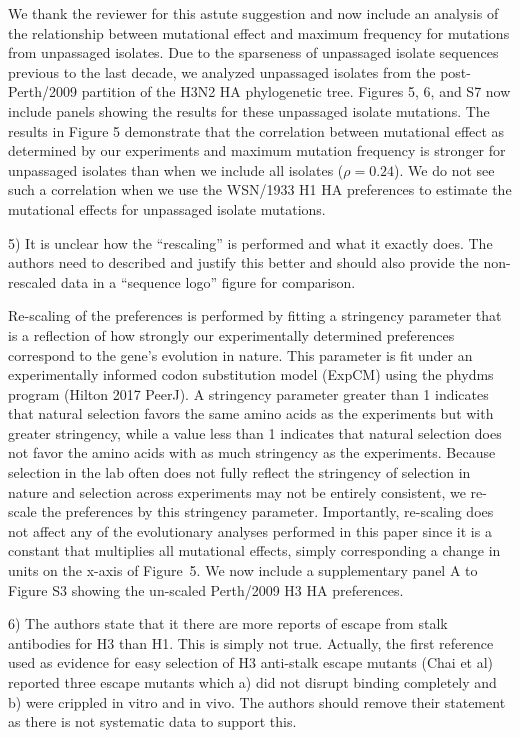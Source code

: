 \documentclass[11pt, oneside]{article}   	%
\newcommand{\response}[1]{{\color{black}#1}}
\begin{document}
\response{We thank the reviewer for this astute suggestion and now include an analysis of the relationship between mutational effect and maximum frequency for mutations from unpassaged isolates.
Due to the sparseness of unpassaged isolate sequences previous to the last decade, we analyzed unpassaged isolates from the post-Perth/2009 partition of the H3N2 HA phylogenetic tree.
Figures 5, 6, and S7 now include panels showing the results for these unpassaged isolate mutations.
The results in Figure 5 demonstrate that the correlation between mutational effect as determined by our experiments and maximum mutation frequency is stronger for unpassaged isolates than when we include all isolates ($\rho = 0.24$).
We do not see such a correlation when we use the WSN/1933 H1 HA preferences to estimate the mutational effects for unpassaged isolate mutations.
}

5) It is unclear how the ``rescaling'' is performed and what it exactly does. The authors need to described and justify this better and should also provide the non-rescaled data in a ``sequence logo'' figure for comparison. 

\response{Re-scaling of the preferences is performed by fitting a stringency parameter that is a reflection of how strongly our experimentally determined preferences correspond to the gene's evolution in nature.
This parameter is fit under an experimentally informed codon substitution model (ExpCM) using the phydms program (Hilton 2017 PeerJ).
A stringency parameter greater than 1 indicates that natural selection favors the same amino acids as the experiments but with greater stringency, while a value less than 1 indicates that natural selection does not favor the amino acids with as much stringency as the experiments.
Because selection in the lab often does not fully reflect the stringency of selection in nature and selection across experiments may not be entirely consistent, we re-scale the preferences by this stringency parameter.
Importantly, re-scaling does not affect any of the evolutionary analyses performed in this paper since it is a constant that multiplies all mutational effects, simply corresponding a change in units on the x-axis of Figure~5.
We now include a supplementary panel A to Figure S3 showing the un-scaled Perth/2009 H3 HA preferences.
}

6) The authors state that it there are more reports of escape from stalk antibodies for H3 than H1. This is simply not true. Actually, the first reference used as evidence for easy selection of H3 anti-stalk escape mutants (Chai et al) reported three escape mutants which a) did not disrupt binding completely and b) were crippled in vitro and in vivo. The authors should remove their statement as there is not systematic data to support this. 
\end{document}
